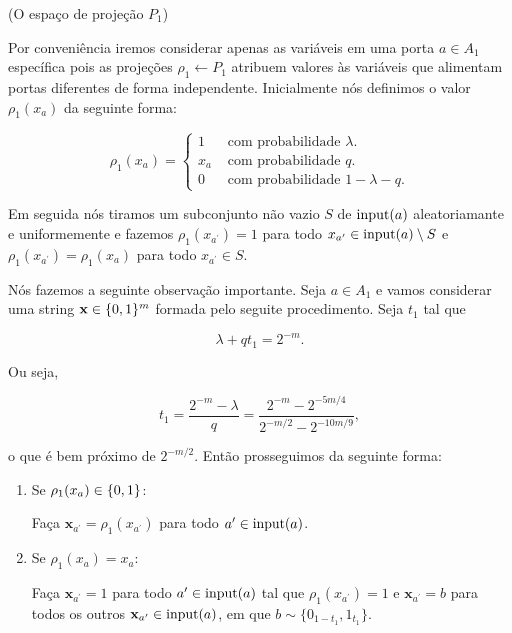 \begin{defi} (O espaço de projeção $P_{1}$) \label{defi_P1}

Por conveniência iremos considerar apenas as variáveis em uma porta $a \in A_{1}$ específica pois as projeções $\rho_{1} \leftarrow P_{1}$ atribuem valores às variáveis que alimentam portas diferentes de forma independente. Inicialmente nós definimos o valor $\rho_{1}(x_{a})$ da seguinte forma:

\begin{equation} \label{defi_P1_eqn}
	\rho_{1}(x_{a}) = \begin{cases}
				1 & \text{ com probabilidade } \lambda. \\
				x_{a} & \text{ com probabilidade } q. \\
				0 & \text{ com probabilidade } 1 - \lambda - q.
			  \end{cases}
\end{equation}

Em seguida nós tiramos um subconjunto não vazio $S$ de $\text{input}(a)$ aleatoriamante e uniformemente e fazemos $\rho_{1}(x_{a^{\prime}}) = 1$ para todo $x_{a^{\prime}} \in \text{input}(a) \setminus S$ e $\rho_{1}(x_{a^{\prime}}) = \rho_{1}(x_{a})$ para todo $x_{a^{\prime}} \in S$.

\end{defi}

Nós fazemos a seguinte observação importante. Seja $a \in A_{1}$ e vamos considerar uma string $\textbf{x} \in \{0, 1\}^{m}$ formada pelo seguite procedimento. Seja $t_{1}$ tal que

\begin{equation} \label{t_defi_1}
	\lambda + qt_{1} = 2^{-m}.
\end{equation}

Ou seja,

\begin{equation} \label{t_defi_2}
	t_{1} = \frac{2^{-m} - \lambda}{q} = \frac{2^{-m} - 2^{-5m/4}}{2^{-m/2} - 2^{-10m/9}},
\end{equation}

o que é bem próximo de $2^{-m/2}$. Então prosseguimos da seguinte forma:

\begin{enumerate}

\item Se $\rho_{1}(x_{a}) \in \{0, 1\}$:

Faça $\textbf{x}_{a^{\prime}} = \rho_{1}(x_{a^{\prime}})$ para todo $a^{\prime} \in \text{input}(a)$.

\item Se $\rho_{1}(x_{a}) = x_{a}$:

Faça $\textbf{x}_{a^{\prime}} = 1$ para todo $a^{\prime} \in \text{input}(a)$ tal que $\rho_{1}(x_{a^{\prime}}) = 1$ e $\textbf{x}_{a^{\prime}} = b$ para todos os outros $\textbf{x}_{a^{\prime}} \in \text{input}(a)$, em que $b \sim \{0_{1 - t_{1}}, 1_{t_{1}}\}$.

\end{enumerate}

